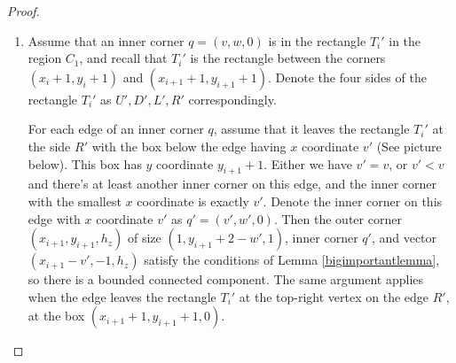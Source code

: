 \documentclass{amsart}[10pt]
\theoremstyle{plain}
\theoremstyle{definition}
\begin{document}
\begin{proof}
\begin{enumerate}






\item
Assume that an inner corner $q=(v,w,0)$ is in the rectangle $T_i'$ in the region $C_1$, and recall that $T_i'$ is the rectangle between the corners $(x_i+1,y_i+1)$ and $(x_{i+1}+1,y_{i+1}+1)$. Denote the four sides of the rectangle $T_i'$ as $U',D',L',R'$ correspondingly.

For each edge of an inner corner $q$, assume that it leaves the rectangle $T_i'$ at the side $R'$ with the box below the edge having $x$ coordinate $v'$ (See picture below). This box has $y$ coordinate $y_{i+1}+1$. Either we have $v'=v$, or $v'<v$ and there's at least another inner corner on this edge, and the inner corner with the smallest $x$ coordinate is exactly $v'$. Denote the inner corner on this edge with $x$ coordinate $v'$ as $q'=(v', w', 0)$. Then the outer corner $(x_{i+1}, y_{i+1},h_z)$ of size $(1, y_{i+1}+2-w',1)$, inner corner $q'$, and vector $(x_{i+1}-v',-1,h_z)$ satisfy the conditions of Lemma \ref{bigimportantlemma}, so there is a bounded connected component. The same argument applies when the edge leaves the rectangle $T_i'$ at the top-right vertex on the edge $R'$, at the box $(x_{i+1}+1,y_{i+1}+1,0)$. 


\end{enumerate}
\end{proof}
\end{document}
